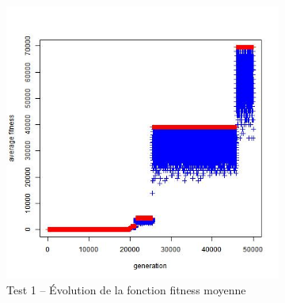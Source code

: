 \documentclass[a4paper,11pt]{article}
\begin{document}
\begin{figure}
\begin{subfigure}{.5\textwidth}
\includegraphics[width=1\linewidth]{1487422477451_evolution_average_fitness.jpeg}
\caption{Test 1 – Évolution de la fonction fitness moyenne}
\label{fig:sub12}
\end{subfigure}
\caption{}
\label{fig:test}
\end{figure}

%
\end{document}
